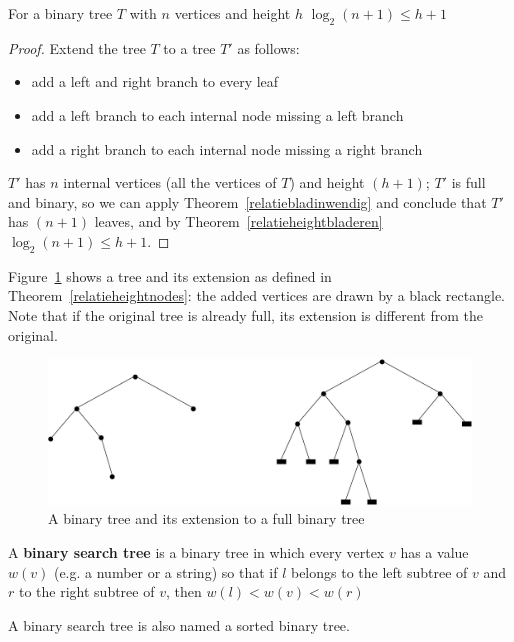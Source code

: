  \begin{theorem} For a binary tree $T$ with $n$ vertices and
height $h$ $\log_2(n+1) \leq h+1$
\label{relatieheightnodes}
\end{theorem}
\begin{proof}
Extend the tree $T$ to a tree $T'$ as follows:
\begin{itemize}
\item
add a left and right branch to every leaf
\item
add a left branch to each internal node missing a left branch
\item
add a right branch to each internal node missing a right branch
\end{itemize}

$T'$ has $n$ internal vertices (all the vertices of $T$) and height
$(h+1)$; $T'$ is full and binary, so we can apply
Theorem~\ref{relatiebladinwendig} and conclude that $T'$ has
$(n+1)$ leaves, and by Theorem~\ref{relatieheightbladeren} $\log_2(n+1)
\leq h+1$.
\end{proof}

Figure~\ref{uitbreiding1} shows a tree and its extension as defined in
Theorem~\ref{relatieheightnodes}: the added vertices are drawn by a
black rectangle. Note that if the original tree is already full, its
extension is different from the original.

\begin{figure}[ht]
\begin{center}
\includegraphics[width=0.6\linewidth,keepaspectratio]{uitbreiding1}
\end{center}
\caption{A binary tree and its extension to a full binary tree\label{uitbreiding1}}
\end{figure}

 \begin{definition}
\textup{A \textbf{binary search tree} is a binary tree in which every
vertex $v$ has a value $w(v)$ (e.g. a number or a string) so that
if $l$ belongs to the left subtree of $v$ and $r$ to the right subtree
of $v$, then  $w(l) < w(v) < w(r)$ }
\end{definition}


A binary search tree is also named a sorted binary tree.

